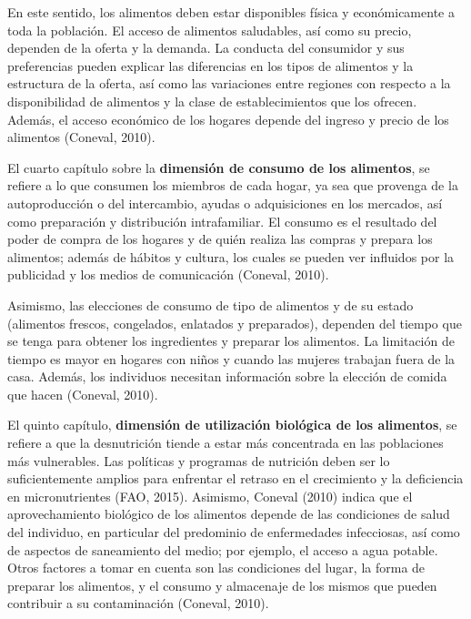 En este sentido, los alimentos deben estar disponibles física y económicamente a toda la población. El acceso de alimentos saludables, así como su precio, dependen de la oferta y la demanda. La conducta del consumidor y sus preferencias pueden explicar las diferencias en los tipos de alimentos y la estructura de la oferta, así como las variaciones entre regiones con respecto a la disponibilidad de alimentos y la clase de establecimientos que los ofrecen. Además, el acceso económico de los hogares depende del ingreso y precio de los alimentos (Coneval, 2010).

El cuarto capítulo sobre la \textbf{dimensión de consumo de los alimentos}, se refiere a lo que consumen los miembros de cada hogar, ya sea que provenga de la autoproducción o del intercambio, ayudas o adquisiciones en los mercados, así como preparación y distribución intrafamiliar. El consumo es el resultado del poder de compra de los hogares y de quién realiza las compras y prepara los alimentos; además de hábitos y cultura, los cuales se pueden ver influidos por la publicidad y los medios de comunicación (Coneval, 2010). 

Asimismo, las elecciones de consumo de tipo de alimentos y de su estado (alimentos frescos, congelados, enlatados y preparados), dependen del tiempo que se tenga para obtener los ingredientes y preparar los alimentos. La limitación de tiempo es mayor en hogares con niños y cuando las mujeres trabajan fuera de la casa. Además, los individuos necesitan información sobre la elección de comida que hacen (Coneval, 2010).

El quinto capítulo, \textbf{dimensión de utilización biológica de los alimentos}, se refiere a que la desnutrición tiende a estar más concentrada en las poblaciones más vulnerables. Las políticas y programas de nutrición deben ser lo suficientemente amplios para enfrentar el retraso en el crecimiento y la deficiencia en micronutrientes (FAO, 2015). Asimismo, Coneval (2010) indica que el aprovechamiento biológico de los alimentos depende de las condiciones de salud del individuo, en particular del predominio de enfermedades infecciosas, así como de aspectos de saneamiento del medio; por ejemplo, el acceso a agua potable. Otros factores a tomar en cuenta son las condiciones del lugar, la forma de preparar los alimentos, y el consumo y almacenaje de los mismos que pueden contribuir a su contaminación (Coneval, 2010). 

